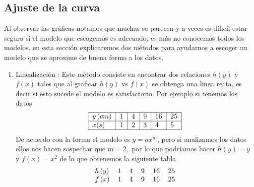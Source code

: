 \documentclass[12pt]{article}
\begin{document}
\subsection{Ajuste de la curva}

Al observar las gr\'{a}ficas notamos que muchas se parecen y a veces es
d\'{i}ficil estar seguro si el modelo que escogemos es adecuado, es m\'{a}s
no conocemos todos los modelos. en esta secci\'{o}n explicaremos dos
m\'{e}todos para ayudarnos a escoger un modelo que se aproxime de buena
forma a los datos.

\begin{enumerate}
\item  Linealizaci\'{o}n :\newline
Este m\'{e}todo consiste en encontrar dos relaciones $h\left( y\right) $ y $%
f\left( x\right) $ tales que al graficar $h\left( y\right) $ vs $f\left(
x\right) $ se obtenga una linea recta, es decir si esto sucede el modelo es
satisfactorio.\newline
Por ejemplo si tenemos los datos 
\begin{equation*}
\begin{tabular}{|l|l|l|l|l|l|}
\hline
$y\left( cm\right) $ & 1 & 4 & 9 & 16 & 25 \\ \hline
$x(s)$ & 1 & 2 & 3 & 4 & 5 \\ \hline
\end{tabular}
\end{equation*}
De acuerdo con la forma el modelo es $y=ax^{m}$, pero si analizamos
los datos ellos nos hacen sospechar que $m=2,$ por lo que podr\'{i}amos
hacer $h\left( y\right) =y$ y $f\left( x\right) =x^{2}$ de lo que obtenemos
la siguiente tabla 
\begin{equation*}
\begin{tabular}{llllll}
$h\left( y\right) $ & 1 & 4 & 9 & 16 & 25 \\ 
$f\left( x\right) $ & 1 & 4 & 9 & 16 & 25
\end{tabular}
\end{equation*}
\end{enumerate}
\end{document}
